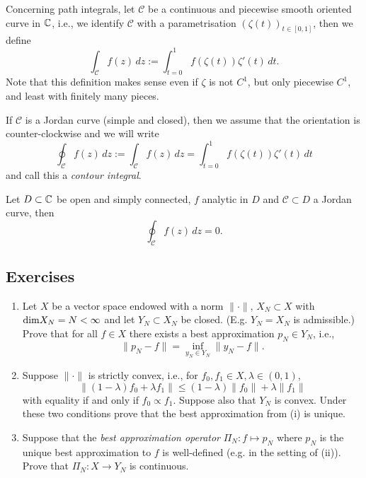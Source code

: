 \def\calC{\mathcal{C}}

Concerning path integrals, let $\calC$ be a continuous and piecewise smooth
oriented  curve in $\mathbb{C}$, i.e., we identify $\calC$ with a parametrisation $(\zeta(t))_{t \in [0, 1]}$, then we define 
\[
    \int_{\calC} f(z) \, dz := \int_{t = 0}^1 f(\zeta(t)) \zeta'(t) \, dt.
\]
Note that this definition makes sense even if $\zeta$ is not $C^1$, but
only piecewise $C^1$, and least with finitely many pieces. 

If $\calC$ is a Jordan curve (simple and closed), then we assume that the orientation is counter-clockwise and we will write
\[
    \oint_{\calC} f(z) \,dz := \int_{\calC} f(z) \, dz
    = \int_{t = 0}^1 f(\zeta(t)) \zeta'(t) \, dt
\]
and call this a {\em contour integral}.

\begin{proposition}
  Let $D \subset \mathbb{C}$ be open and simply connected, $f$ analytic in $D$ and
    $\calC \subset D$ a Jordan curve, then
    \[
        \oint_{\calC} f(z) \, dz = 0.
    \]
\end{proposition}



\subsection{Exercises}

\begin{exercise}
  \label{exr:prelims:bestapprox}
  \begin{enumerate} \ilist
  \item Let $X$ be a vector space endowed with a norm $\|\cdot\|$,
  $X_N \subset X$ with ${\rm dim} X_N = N < \infty$ and let
  $Y_N \subset X_N$ be closed. (E.g. $Y_N=X_N$ is admissible.)
  Prove that for all $f \in X$ there exists a best approximation
  $p_N \in Y_N$, i.e.,
  \[
    \| p_N - f \|  = \inf_{y_N \in Y_N} \|y_N - f\|.
  \]

  \item Suppose $\|\cdot\|$ is strictly convex, i.e., for $f_0, f_1 \in X, \lambda \in (0, 1)$,
  \[
    \| (1-\lambda) f_0 + \lambda f_1 \| \leq (1-\lambda) \|f_0\| + \lambda \|f_1 \|
  \]
  with equality if and only if $f_0 \propto f_1$. Suppose also that $Y_N$ is
  convex. Under these two conditions prove that the best approximation from (i)
  is unique.

  \item Suppose that the {\em best approximation operator}
    $\Pi_N : f \mapsto p_N$ where $p_N$ is the unique best approximation to $f$
    is well-defined (e.g. in the setting of (ii)). Prove that $\Pi_N : X \to
    Y_N$ is continuous.
  \end{enumerate}
\end{exercise}

